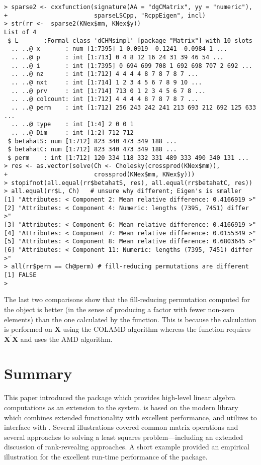 \documentclass[shortnames,article]{jss}
\begin{document}
\begin{verbatim}
> sparse2 <- cxxfunction(signature(AA = "dgCMatrix", yy = "numeric"),
+                        sparseLSCpp, "RcppEigen", incl)
> str(rr <-  sparse2(KNex$mm, KNex$y))
List of 4
 $ L       :Formal class 'dCHMsimpl' [package "Matrix"] with 10 slots
  .. ..@ x       : num [1:7395] 1 0.0919 -0.1241 -0.0984 1 ...
  .. ..@ p       : int [1:713] 0 4 8 12 16 24 31 39 46 54 ...
  .. ..@ i       : int [1:7395] 0 694 699 708 1 692 698 707 2 692 ...
  .. ..@ nz      : int [1:712] 4 4 4 4 8 7 8 7 8 7 ...
  .. ..@ nxt     : int [1:714] 1 2 3 4 5 6 7 8 9 10 ...
  .. ..@ prv     : int [1:714] 713 0 1 2 3 4 5 6 7 8 ...
  .. ..@ colcount: int [1:712] 4 4 4 4 8 7 8 7 8 7 ...
  .. ..@ perm    : int [1:712] 256 243 242 241 213 693 212 692 125 633 ...
  .. ..@ type    : int [1:4] 2 0 0 1
  .. ..@ Dim     : int [1:2] 712 712
 $ betahatS: num [1:712] 823 340 473 349 188 ...
 $ betahatC: num [1:712] 823 340 473 349 188 ...
 $ perm    : int [1:712] 120 334 118 332 331 489 333 490 340 131 ...
> res <- as.vector(solve(Ch <- Cholesky(crossprod(KNex$mm)),
+                        crossprod(KNex$mm, KNex$y)))
> stopifnot(all.equal(rr$betahatS, res), all.equal(rr$betahatC, res))
> all.equal(rr$L, Ch)   # unsure why different; Eigen's is smaller
[1] "Attributes: < Component 2: Mean relative difference: 0.4166919 >"  
[2] "Attributes: < Component 4: Numeric: lengths (7395, 7451) differ >" 
[3] "Attributes: < Component 6: Mean relative difference: 0.4166919 >"  
[4] "Attributes: < Component 7: Mean relative difference: 0.0155349 >"  
[5] "Attributes: < Component 8: Mean relative difference: 0.6803645 >"  
[6] "Attributes: < Component 11: Numeric: lengths (7395, 7451) differ >"
> all(rr$perm == Ch@perm) # fill-reducing permutations are different
[1] FALSE
> 
\end{verbatim}

The last two comparisons show that the fill-reducing permutation
computed for the  object is
better (in the sense of producing a factor with fewer non-zero
elements) than the one calculated by the 
function.  This is because the  calculation is
performed on $\bm X$ using the COLAMD algorithm whereas the
 function requires $\bm X^\prime\bm X$ and uses
the AMD algorithm.


\section{Summary}

This paper introduced the  package which provides high-level
linear algebra computations as an extension to the  system.
 is based on the modern  library 
which combines extended functionality with excellent performance, and
utilizes  to interface  with .
Several illustrations covered common matrix operations and
several approaches to solving a least squares problem---including an extended
discussion of rank-revealing approaches.  A short example provided
an empirical illustration  for the excellent run-time performance of the
 package.


\end{document}
